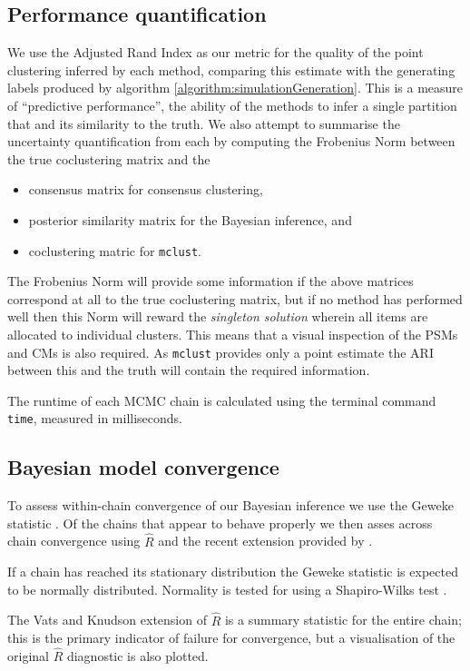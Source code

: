 \documentclass{bioinfo}
\begin{document}
\begin{methods}
\subsection{Performance quantification}

We use the Adjusted Rand Index as our metric for the quality of the point clustering inferred by each method, comparing this estimate with the generating labels produced by algorithm \ref{algorithm:simulationGeneration}. This is a measure of ``predictive performance'', the ability of the methods to infer a single partition that and its similarity to the truth. We also attempt to summarise the uncertainty quantification from each by computing the Frobenius Norm between the true coclustering matrix and the 

\begin{itemize}
	\item consensus matrix for consensus clustering,
	\item posterior similarity matrix for the Bayesian inference, and
	\item coclustering matric for \texttt{mclust}.
\end{itemize}
The Frobenius Norm will provide some information if the above matrices correspond at all to the true coclustering matrix, but if no method has performed well then this Norm will reward the \emph{singleton solution} wherein all items are allocated to individual clusters. This means that a visual inspection of  the PSMs and CMs is also required. As \texttt{mclust} provides only a point estimate the ARI between this and the truth will contain the required information.

The runtime of each MCMC chain is calculated using the terminal command \texttt{time}, measured in milliseconds.

\subsection{Bayesian model convergence}
To assess within-chain convergence of our Bayesian inference we use the Geweke statistic \cite{geweke1991evaluating}. Of the chains that appear to behave properly we then asses across chain convergence using $\hat{R}$ \cite{gelman1992inference} and the recent extension provided by \citealp{vats2018revisiting}. 

If a chain has reached its stationary distribution the Geweke statistic is expected to be normally distributed. Normality is tested for using a Shapiro-Wilks test \cite{shapiro1965analysis}.

The Vats and Knudson extension of $\hat{R}$ is a summary statistic for the entire chain; this is the primary indicator of failure for convergence, but a visualisation of the original $\hat{R}$ diagnostic is also plotted.

\end{methods}
\end{document}
